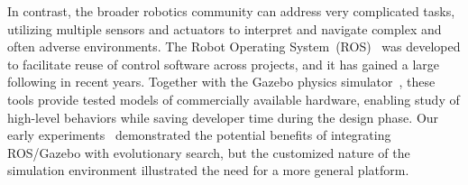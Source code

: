 In contrast, the broader robotics community can address very complicated tasks,
utilizing multiple sensors and actuators to interpret and navigate 
complex and often adverse environments.
% 
The Robot Operating System~(ROS)~\cite{ROS.main} was developed to facilitate reuse of control software 
across projects, and it has gained a large following in recent years.
%
Together with the Gazebo physics simulator~\cite{Gazebo_paper_ref}, these tools provide tested models of commercially available hardware, enabling study of high-level behaviors while saving developer time during the design phase. 
%
%
%
%
Our early experiments~\cite{ClarkSSCI2017} demonstrated the potential benefits of integrating ROS/Gazebo with evolutionary search, but the customized nature of the simulation environment illustrated the need for a more
general platform.
%
%


